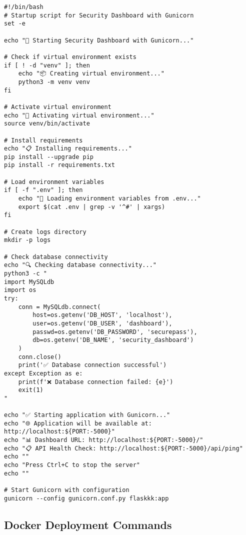 \documentclass[12pt,a4paper]{report}
\begin{document}
\begin{lstlisting}[style=bashstyle, caption=Gunicorn Startup Automation]
#!/bin/bash
# Startup script for Security Dashboard with Gunicorn
set -e

echo "🚀 Starting Security Dashboard with Gunicorn..."

# Check if virtual environment exists
if [ ! -d "venv" ]; then
    echo "📦 Creating virtual environment..."
    python3 -m venv venv
fi

# Activate virtual environment
echo "🔧 Activating virtual environment..."
source venv/bin/activate

# Install requirements
echo "📋 Installing requirements..."
pip install --upgrade pip
pip install -r requirements.txt

# Load environment variables
if [ -f ".env" ]; then
    echo "🔐 Loading environment variables from .env..."
    export $(cat .env | grep -v '^#' | xargs)
fi

# Create logs directory
mkdir -p logs

# Check database connectivity
echo "🔍 Checking database connectivity..."
python3 -c "
import MySQLdb
import os
try:
    conn = MySQLdb.connect(
        host=os.getenv('DB_HOST', 'localhost'),
        user=os.getenv('DB_USER', 'dashboard'),
        passwd=os.getenv('DB_PASSWORD', 'securepass'),
        db=os.getenv('DB_NAME', 'security_dashboard')
    )
    conn.close()
    print('✅ Database connection successful')
except Exception as e:
    print(f'❌ Database connection failed: {e}')
    exit(1)
"

echo "✅ Starting application with Gunicorn..."
echo "🌐 Application will be available at: http://localhost:${PORT:-5000}"
echo "📊 Dashboard URL: http://localhost:${PORT:-5000}/"
echo "📋 API Health Check: http://localhost:${PORT:-5000}/api/ping"
echo ""
echo "Press Ctrl+C to stop the server"
echo ""

# Start Gunicorn with configuration
gunicorn --config gunicorn.conf.py flaskkk:app
\end{lstlisting}

\subsection{Docker Deployment Commands}
\end{document}
